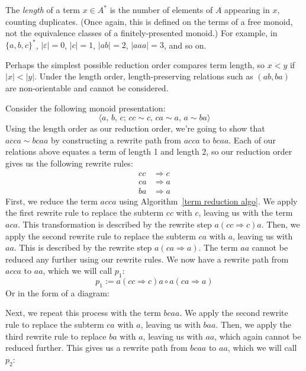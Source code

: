 \documentclass[../generics]{subfiles}
\begin{document}
\begin{definition}
The \emph{length} of a term $x\in A^*$ is the number of elements of $A$ appearing in $x$, counting duplicates. (Once again, this is defined on the terms of a free monoid, not the equivalence classes of a finitely-presented monoid.) For example, in $\{a,b,c\}^*$, $|\varepsilon|=0$, $|c|=1$, $|ab|=2$, $|aaa|=3$, and so on.
\end{definition}
Perhaps the simplest possible reduction order compares term length, so $x<y$ if $|x|<|y|$. Under the length order, length-preserving relations such as $(ab, ba)$ are non-orientable and cannot be considered.
\begin{example} Consider the following monoid presentation:
\[\langle a,\,b,\,c;\,cc\sim c,\,ca\sim a,\,a\sim ba\rangle\]
Using the length order as our reduction order, we're going to show that $acca\sim bcaa$ by constructing a rewrite path from $acca$ to $bcaa$. Each of our relations above equates a term of length 1 and length 2, so our reduction order gives us the following rewrite rules:
\begin{align*}
cc&\Rightarrow c\\
ca&\Rightarrow a\\
ba&\Rightarrow a
\end{align*}
First, we reduce the term $acca$ using Algorithm~\ref{term reduction algo}. We apply the first rewrite rule to replace the subterm $cc$ with $c$, leaving us with the term $aca$. This transformation is described by the rewrite step $a(cc\Rightarrow c)a$. Then, we apply the second rewrite rule to replace the subterm $ca$ with $a$, leaving us with $aa$. This is described by the rewrite step $a(ca\Rightarrow a)$. The term $aa$ cannot be reduced any further using our rewrite rules. We now have a rewrite path from $acca$ to $aa$, which we will call $p_1$:
\[p_1 := a(cc\Rightarrow c)a\circ a(ca\Rightarrow a)\]
Or in the form of a diagram:
\begin{quote}
\end{quote}
Next, we repeat this process with the term $bcaa$. We apply the second rewrite rule to replace the subterm $ca$ with $a$, leaving us with $baa$. Then, we apply the third rewrite rule to replace $ba$ with $a$, leaving us with $aa$, which again cannot be reduced further. This gives us a rewrite path from $bcaa$ to $aa$, which we will call $p_2$:

\end{example}
\end{document}
